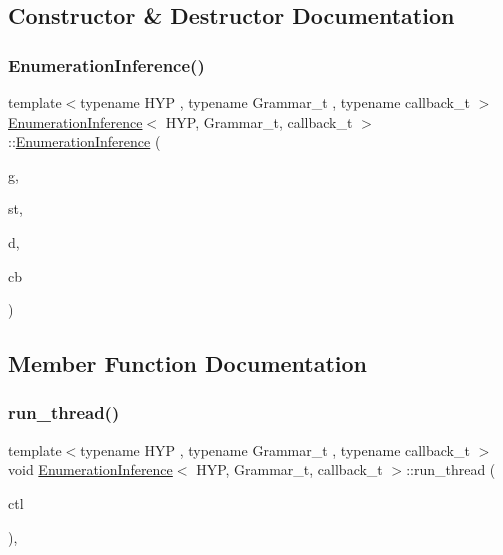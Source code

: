 \subsection{Constructor \& Destructor Documentation}
\mbox{\label{class_enumeration_inference_acce2365fb3b45ab53414d5dd93c18f11}} 
\subsubsection{\texorpdfstring{Enumeration\+Inference()}{EnumerationInference()}}
{\footnotesize\ttfamily template$<$typename H\+YP , typename Grammar\+\_\+t , typename callback\+\_\+t $>$ \\
\hyperlink{class_enumeration_inference}{Enumeration\+Inference}$<$ H\+YP, Grammar\+\_\+t, callback\+\_\+t $>$\+::\hyperlink{class_enumeration_inference}{Enumeration\+Inference} (\begin{DoxyParamCaption}\item[{Grammar\+\_\+t $\ast$}]{g,  }\item[{\hyperlink{_nonterminal_8h_a1c5bfe9b903f69c83bbde5da7035fef3}{nonterminal\+\_\+t}}]{st,  }\item[{typename H\+Y\+P\+::data\+\_\+t $\ast$}]{d,  }\item[{callback\+\_\+t \&}]{cb }\end{DoxyParamCaption})\hspace{0.3cm}{\ttfamily [inline]}}



\subsection{Member Function Documentation}
\mbox{\label{class_enumeration_inference_a257f7b3346772057c6f5b7ff049a9350}} 
\subsubsection{\texorpdfstring{run\+\_\+thread()}{run\_thread()}}
{\footnotesize\ttfamily template$<$typename H\+YP , typename Grammar\+\_\+t , typename callback\+\_\+t $>$ \\
void \hyperlink{class_enumeration_inference}{Enumeration\+Inference}$<$ H\+YP, Grammar\+\_\+t, callback\+\_\+t $>$\+::run\+\_\+thread (\begin{DoxyParamCaption}\item[{\hyperlink{struct_control}{Control}}]{ctl }\end{DoxyParamCaption})\hspace{0.3cm}{\ttfamily [inline]}, {\ttfamily [override]}}



